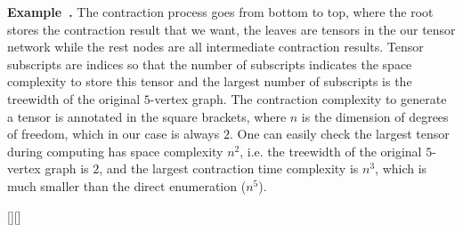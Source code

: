 \documentclass[onefignum, onetabnum]{siamart190516}
\newcommand{\<}{\langle}
\renewcommand{\>}{\rangle}
\newcommand{\blue}[1]{[{\bf  \color{blue}{JG: #1}}]}
\newcommand{\purple}[1]{[{\bf  \color{purple}{MC: #1}}]}
\newcounter{example}
\newenvironment{example}[1][]{\refstepcounter{example}\par\medskip
   \noindent \textbf{Example~\theexample. #1} \rmfamily}{\medskip}
\begin{document}
\begin{example}
The contraction process goes from bottom to top, where the root stores the contraction result that we want, the leaves are tensors in the our tensor network while the rest nodes are all intermediate contraction results.
Tensor subscripts are indices so that the number of subscripts indicates the space complexity to store this tensor and the largest number of subscripts is the treewidth of the original $5$-vertex graph. The contraction complexity to generate a tensor is annotated in the square brackets, where $n$ is the dimension of degrees of freedom, which in our case is always $2$.
One can easily check the largest tensor during computing has space complexity $n^2$, i.e. the treewidth of the original $5$-vertex graph is $2$, and the largest contraction time complexity is $n^3$, which is much smaller than the direct enumeration ($n^5$).
\end{example}

\purple{I have not checked this yet but will
tomorrow. Is it really easy/simple enough to do without writing stuff down? Is this the simplest
example possible? The equations look quite formidable at first glance, and it takes a lot of time
to match the hyperedge labels in the equation to the physical graph.}\blue{sometimes I am afraid the example is too trivial to be useful. The simplest example to show contraction order matters can be a 3-vertex one.}
\end{document}
